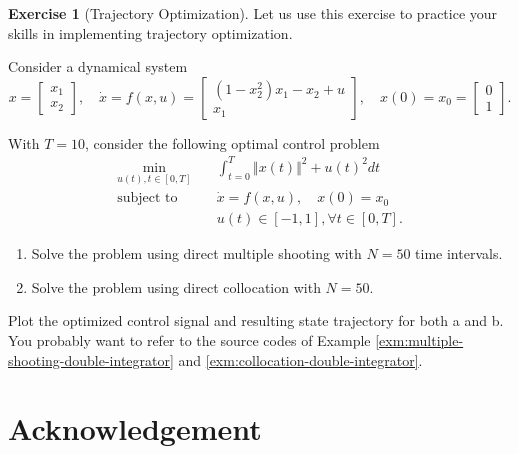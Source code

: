 \documentclass[
]{book}
\theoremstyle{definition}
\theoremstyle{definition}
\theoremstyle{definition}
\newtheorem{exercise}{Exercise}[chapter]
\theoremstyle{definition}
\theoremstyle{remark}
\begin{document}
\begin{exercise}[Trajectory Optimization]
\protect\hypertarget{exr:shooting-and-collocation}{}\label{exr:shooting-and-collocation}Let us use this exercise to practice your skills in implementing trajectory optimization.

Consider a dynamical system
\[
x = \begin{bmatrix}
x_1 \\ x_2
\end{bmatrix}, \quad \dot{x} = f(x,u) = \begin{bmatrix}
(1-x_2^2)x_1 - x_2 + u \\
x_1 
\end{bmatrix}, \quad x(0) = x_0 = \begin{bmatrix} 0 \\ 1 \end{bmatrix}.
\]

With \(T=10\), consider the following optimal control problem
\begin{equation}
\begin{split}
\min_{u(t),t \in [0,T]} & \quad \int_{t=0}^T \Vert x(t) \Vert^2 + u(t)^2 dt \\
\text{subject to} & \quad \dot{x} = f(x,u), \quad x(0) = x_0 \\
& \quad u(t) \in [-1,1],\forall t \in [0,T].
\end{split}
\end{equation}

\begin{enumerate}
\def\labelenumi{\alph{enumi}.}
\item
  Solve the problem using direct multiple shooting with \(N=50\) time intervals.
\item
  Solve the problem using direct collocation with \(N=50\).
\end{enumerate}

Plot the optimized control signal and resulting state trajectory for both a and b. You probably want to refer to the source codes of Example \ref{exm:multiple-shooting-double-integrator} and \ref{exm:collocation-double-integrator}.
\end{exercise}

\hypertarget{acknowledgement}{%
\chapter*{Acknowledgement}\label{acknowledgement}}

\hypertarget{appendix-appendix}{%
\appendix}
\end{document}
